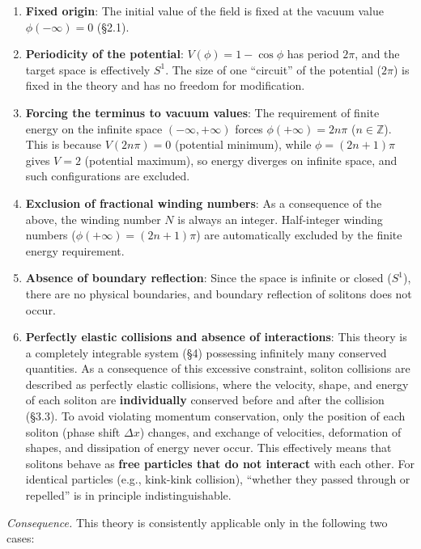 \documentclass[a4paper,11pt]{article}
\providecommand{\tightlist}{\setlength{\itemsep}{0pt}\setlength{\parskip}{0pt}}
\begin{document}
\begin{enumerate}
\def\labelenumi{\arabic{enumi}.}
\tightlist
\item
  \textbf{Fixed origin}: The initial value of the field is fixed at the
  vacuum value \(\phi(-\infty) = 0\) (§2.1).
\item
  \textbf{Periodicity of the potential}: \(V(\phi) = 1-\cos\phi\) has
  period \(2\pi\), and the target space is effectively \(S^1\). The size
  of one ``circuit'' of the potential (\(2\pi\)) is fixed in the theory
  and has no freedom for modification.
\item
  \textbf{Forcing the terminus to vacuum values}: The requirement of
  finite energy on the infinite space \((-\infty, +\infty)\) forces
  \(\phi(+\infty) = 2n\pi\) (\(n \in \mathbb{Z}\)). This is because
  \(V(2n\pi) = 0\) (potential minimum), while \(\phi = (2n+1)\pi\) gives
  \(V = 2\) (potential maximum), so energy diverges on infinite space,
  and such configurations are excluded.
\item
  \textbf{Exclusion of fractional winding numbers}: As a consequence of
  the above, the winding number \(N\) is always an integer. Half-integer
  winding numbers (\(\phi(+\infty) = (2n+1)\pi\)) are automatically
  excluded by the finite energy requirement.
\item
  \textbf{Absence of boundary reflection}: Since the space is infinite
  or closed (\(S^1\)), there are no physical boundaries, and boundary
  reflection of solitons does not occur.
\item
  \textbf{Perfectly elastic collisions and absence of interactions}:
  This theory is a completely integrable system (§4) possessing
  infinitely many conserved quantities. As a consequence of this
  excessive constraint, soliton collisions are described as perfectly
  elastic collisions, where the velocity, shape, and energy of each
  soliton are \textbf{individually} conserved before and after the
  collision (§3.3). To avoid violating momentum conservation, only the
  position of each soliton (phase shift \(\Delta x\)) changes, and
  exchange of velocities, deformation of shapes, and dissipation of
  energy never occur. This effectively means that solitons behave as
  \textbf{free particles that do not interact} with each other. For
  identical particles (e.g., kink-kink collision), ``whether they passed
  through or repelled'' is in principle indistinguishable.
\end{enumerate}

\emph{Consequence.} This theory is consistently applicable only in the
following two cases:
\end{document}
